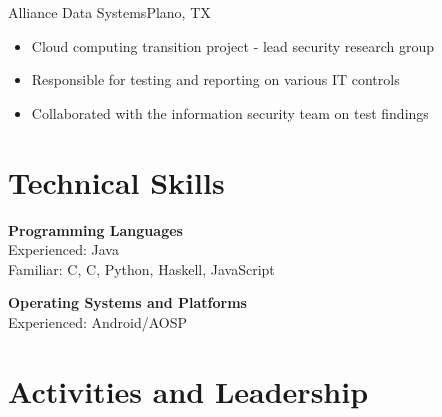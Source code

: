 \documentclass[11pt,a4paper,sans]{moderncv}
\newcommand{\Rplus}{\protect\hspace{-.1em}\protect\raisebox{.35ex}{\smaller{\smaller\textbf{+}}}}
\newcommand{\Cpp}{\mbox{C\Rplus\Rplus}\xspace}
\newcommand{\spacing}{4pt}
\begin{document}
\vspace{\spacing}

  {Alliance Data Systems}{Plano, TX}{}{\vspace{3pt}
    \begin{itemize}
      \setlength{\itemindent}{1em}
      \item Cloud computing transition project - lead security research group
      \item Responsible for testing and reporting on various IT controls
      \item Collaborated with the information security team on test findings
    \end{itemize}
    }

\section{Technical Skills}

\vspace{-.75em}

\begin{multicols}{2}
\noindent

\textbf{Programming Languages} \\
  Experienced: Java \\
  Familiar: \Cpp, C, Python, Haskell, JavaScript

\textbf{Operating Systems and Platforms} \\
  Experienced: Android/AOSP

\end{multicols}

\vspace{-1.5em}

\section{Activities and Leadership}

\vspace{\spacing}

\addvspace{-1em}


\addvspace{-1.25em}


\addvspace{-1.25em}

\end{document}
